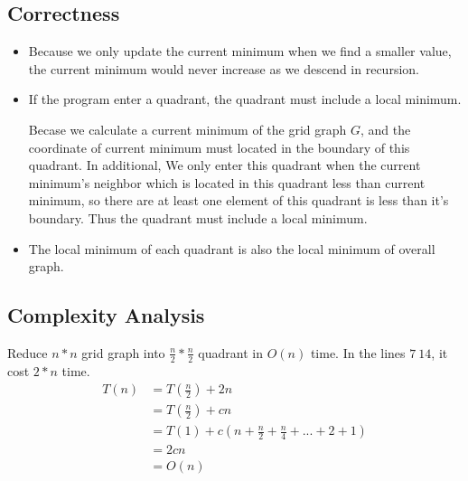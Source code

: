 \documentclass[UTF8,a4paper,12pt]{article}
\begin{document}
	\newpage
	\subsection{Correctness}
		\begin{itemize}
			\item Because we only update the current minimum when we find a smaller value, the current minimum would never increase as we descend in recursion. 
			\item If the program enter a quadrant, the quadrant must include a local minimum. 
			
			\setlength{\parindent}{2em}Becase we calculate a current minimum of the grid graph $ G $, and the coordinate of current minimum must located in the boundary of this quadrant. In additional, We only enter this quadrant when the current minimum's neighbor which is located in this quadrant less than current minimum, so there are at least one element of this quadrant is less than it's boundary. Thus the quadrant must include a local minimum.
				
			\item The local minimum of each quadrant is also the local minimum of overall graph.
		\end{itemize}

	\subsection{Complexity Analysis}
	
		Reduce $ n*n $ grid graph into $ \frac{n}{2}*\frac{n}{2} $ quadrant in $ O(n) $ time. In the lines $ 7~14 $, it cost $ 2*n $ time.
		\begin{align*}
			T(n) &= T(\frac{n}{2}) + 2n\\
			& = T(\frac{n}{2}) + cn\\
			& = T(1) + c(n+\frac{n}{2}+\frac{n}{4}+...+2+1)\\
			& = 2cn\\
			& = O(n)
		\end{align*}	
\end{document}
